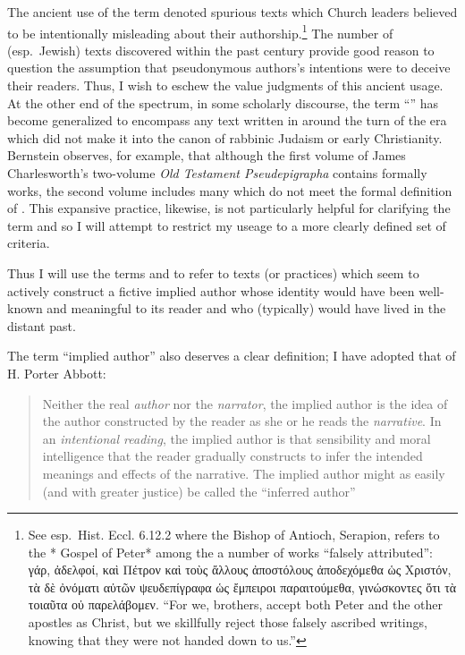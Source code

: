  The ancient use of the term \psa denoted spurious texts which Church leaders believed to be intentionally misleading about their authorship.\footnote{See esp.~Hist. Eccl. 6.12.2 where the Bishop of   Antioch, Serapion, refers to the * Gospel of Peter* among the a number   of works ``falsely attributed'': γάρ, ἀδελφοί, καὶ Πέτρον καὶ τοὺς   ἄλλους ἀποστόλους ἀποδεχόμεθα ὡς Χριστόν, τὰ δὲ ὀνόματι αὐτῶν   ψευδεπίγραφα ὡς ἔμπειροι παραιτούμεθα, γινώσκοντες ὅτι τὰ τοιαῦτα οὐ   παρελάβομεν. ``For we, brothers, accept both Peter and the other   apostles as Christ, but we skillfully reject those falsely ascribed   writings, knowing that they were not handed down to us.''} The number of (esp.~Jewish) \psgraphical texts discovered within the past century provide good reason to question the assumption that pseudonymous authors's intentions were to deceive their readers.\autocites[53--58]{mroczek2016}[See also][]{reed_jts2009} Thus, I wish to eschew the value judgments of this ancient usage. At the other end of the spectrum, in some scholarly discourse, the term ``\psa'' has become generalized to encompass any text written in around the turn of the era which did not make it into the canon of rabbinic Judaism or early Christianity. Bernstein observes, for example, that although the first volume of James Charlesworth's two-volume \emph{Old Testament Pseudepigrapha} contains formally \psgraphic works, the second volume includes many which do not meet the formal definition of \psa.\autocites[2]{bernstein_chazon-etal1999}{charlesworth_OTP} This expansive practice, likewise, is not particularly helpful for clarifying the term and so I will attempt to restrict my useage to a more clearly defined set of criteria.

 Thus I will use the terms \psy and \psa to refer to texts (or practices) which seem to actively construct a fictive implied author whose identity would have been well-known and meaningful to its reader and who (typically) would have lived in the distant past.

 The term ``implied author'' also deserves a clear definition; I have adopted that of H. Porter Abbott:

 \begin{quote} Neither the real \emph{author} nor the \emph{narrator}, the implied author is the idea of the author constructed by the reader as she or he reads the \emph{narrative}. In an \emph{intentional reading}, the implied author is that sensibility and moral intelligence that the reader gradually constructs to infer the intended meanings and effects of the narrative. The implied author might as easily (and with greater justice) be called the ``inferred author'' \autocite[235]{abbott2008} \end{quote}

